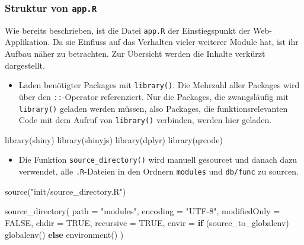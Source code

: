 \documentclass[
]{article}
\newenvironment{Shaded}{\begin{snugshade}}{\end{snugshade}}
\newcommand{\AttributeTok}[1]{\textcolor[rgb]{0.77,0.63,0.00}{#1}}
\newcommand{\ConstantTok}[1]{\textcolor[rgb]{0.00,0.00,0.00}{#1}}
\newcommand{\ControlFlowTok}[1]{\textcolor[rgb]{0.13,0.29,0.53}{\textbf{#1}}}
\newcommand{\FunctionTok}[1]{\textcolor[rgb]{0.00,0.00,0.00}{#1}}
\newcommand{\NormalTok}[1]{#1}
\newcommand{\StringTok}[1]{\textcolor[rgb]{0.31,0.60,0.02}{#1}}
\providecommand{\tightlist}{%
  \setlength{\itemsep}{0pt}\setlength{\parskip}{0pt}}
\begin{document}
\hypertarget{struktur-von-app.r}{%
\subsubsection{\texorpdfstring{Struktur von \texttt{app.R}}{Struktur von app.R}}\label{struktur-von-app.r}}

Wie bereits beschrieben, ist die Datei \texttt{app.R} der Einstiegspunkt der Web-Applikation. Da sie Einfluss auf das Verhalten vieler weiterer Module hat, ist ihr Aufbau näher zu betrachten. Zur Übersicht werden die Inhalte verkürzt dargestellt.

\begin{itemize}
\tightlist
\item
  Laden benötigter Packages mit \texttt{library()}. Die Mehrzahl aller Packages wird über den \texttt{::}-Operator referenziert. Nur die Packages, die zwangsläufig mit \texttt{library()} geladen werden müssen, also Packages, die funktionsrelevanten Code mit dem Aufruf von \texttt{library()} verbinden, werden hier geladen.
\end{itemize}

\begin{Shaded}
\begin{Highlighting}[]
\FunctionTok{library}\NormalTok{(shiny)}
\FunctionTok{library}\NormalTok{(shinyjs)}
\FunctionTok{library}\NormalTok{(dplyr)}
\FunctionTok{library}\NormalTok{(qrcode)}
\end{Highlighting}
\end{Shaded}

\begin{itemize}
\tightlist
\item
  Die Funktion \texttt{source\_directory()} wird manuell gesourcet und danach dazu verwendet, alle \texttt{.R}-Dateien in den Ordnern \texttt{modules} und \texttt{db/func} zu sourcen.
\end{itemize}

\begin{Shaded}
\begin{Highlighting}[]
\FunctionTok{source}\NormalTok{(}\StringTok{"init/source\_directory.R"}\NormalTok{)}

\FunctionTok{source\_directory}\NormalTok{(}
    \AttributeTok{path =} \StringTok{"modules"}\NormalTok{,}
    \AttributeTok{encoding =} \StringTok{"UTF{-}8"}\NormalTok{,}
    \AttributeTok{modifiedOnly =} \ConstantTok{FALSE}\NormalTok{,}
    \AttributeTok{chdir =} \ConstantTok{TRUE}\NormalTok{,}
    \AttributeTok{recursive =} \ConstantTok{TRUE}\NormalTok{,}
    \AttributeTok{envir =} \ControlFlowTok{if}\NormalTok{ (source\_to\_globalenv) }\FunctionTok{globalenv}\NormalTok{() }\ControlFlowTok{else} \FunctionTok{environment}\NormalTok{()}
\NormalTok{)}
\end{Highlighting}
\end{Shaded}
\end{document}
